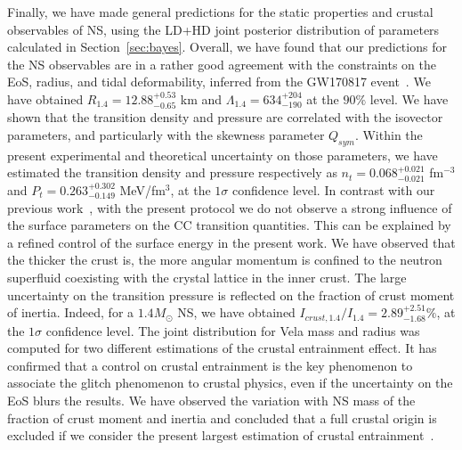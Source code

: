 Finally, we have made general predictions for the static properties and crustal 
observables of NS, using the LD+HD joint posterior distribution of parameters 
calculated in Section~\ref{sec:bayes}. Overall, we have found that our 
predictions for the NS observables are in a rather good agreement with the
constraints on the EoS, radius, and tidal deformability, inferred from the 
GW170817 event~\cite{De2018,GW1}. We have obtained 
$R_{1.4}=12.88_{-0.65}^{+0.53}$ km and $\Lambda_{1.4} = 634_{-190}^{+204}$ at 
the $90\%$ level. 
We have shown that the transition density and pressure are 
correlated with the isovector parameters, and particularly with the skewness 
parameter $Q_{sym}$. Within the present experimental and theoretical 
uncertainty on those parameters, we have estimated the transition density and
pressure respectively as $n_t=0.068_{-0.021}^{+0.021}$ fm$^{-3}$ and
$P_t=0.263_{-0.149}^{+0.302}$ MeV/fm$^3$, at the $1\sigma$ confidence level. In
contrast with our previous work~\cite{Carreau2019cc}, with the present protocol 
we do not observe a strong influence of
the surface parameters on the CC transition quantities. This can be explained 
by a refined control of the surface energy in the present work.
We have observed that the thicker the crust is, the more angular momentum is
confined to the neutron superfluid coexisting with the crystal lattice in the
inner crust. The large uncertainty on the transition pressure is reflected on
the fraction of crust moment of inertia. Indeed, for a $1.4M_\odot$ NS, we have 
obtained $I_{crust,1.4}/I_{1.4}=2.89_{-1.68}^{+2.51} \%$, at the $1\sigma$ 
confidence level. The joint distribution for Vela mass and radius was
computed for two different estimations of the crustal entrainment effect. It 
has confirmed that a control on crustal entrainment is the key phenomenon to
associate the glitch phenomenon to crustal physics, even if the uncertainty on
the EoS blurs the results. We have observed the variation with NS
mass of the fraction of crust moment and inertia and concluded that a full 
crustal origin is excluded if we consider the present largest estimation of 
crustal entrainment~\cite{Delsate2016}.

\clearpage\thispagestyle{empty}
